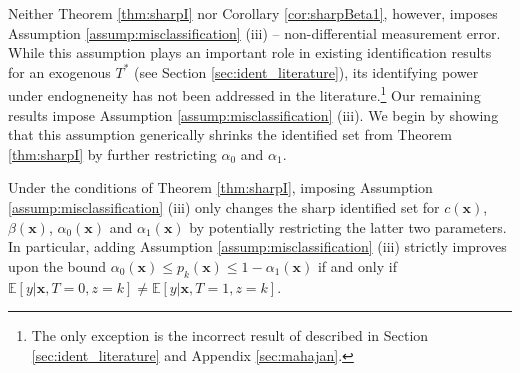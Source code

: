 Neither Theorem \ref{thm:sharpI} nor Corollary \ref{cor:sharpBeta1}, however, imposes Assumption \ref{assump:misclassification} (iii) -- non-differential measurement error.
While this assumption plays an important role in existing identification results for an exogenous $T^*$ (see Section \ref{sec:ident_literature}), its identifying power under endogneneity has not been addressed in the literature.\footnote{The only exception is the incorrect result of \cite{Mahajan} described in Section \ref{sec:ident_literature} and Appendix \ref{sec:mahajan}.}
Our remaining results impose Assumption \ref{assump:misclassification} (iii). 
We begin by showing that this assumption generically shrinks the identified set from Theorem \ref{thm:sharpI} by further restricting $\alpha_0$ and $\alpha_1$.

\begin{thm}
  Under the conditions of Theorem \ref{thm:sharpI}, imposing Assumption \ref{assump:misclassification} (iii) only changes the sharp identified set for $c(\mathbf{x})$, $\beta(\mathbf{x})$, $\alpha_0(\mathbf{x})$ and $\alpha_1(\mathbf{x})$ by potentially restricting the latter two parameters. 
  In particular, adding Assumption \ref{assump:misclassification} (iii) strictly improves upon the bound $\alpha_0(\mathbf{x}) \leq p_k(\mathbf{x}) \leq 1 - \alpha_1(\mathbf{x})$ if and only if
  $\mathbb{E}\left[y|\mathbf{x},T=0,z=k  \right] \neq \mathbb{E}\left[ y|\mathbf{x},T=1,z=k \right]$. 
  \label{thm:shrink}
\end{thm}


